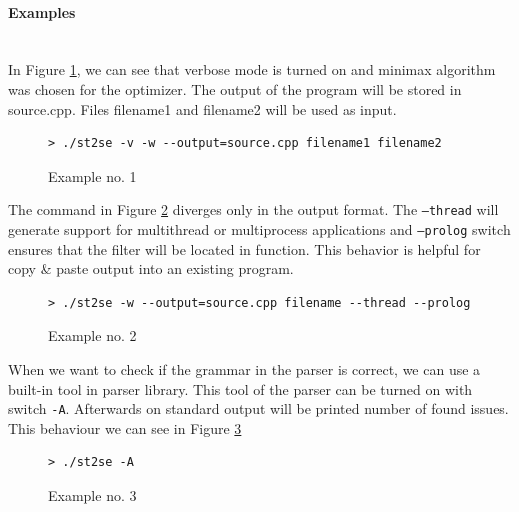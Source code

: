 \paragraph{Examples} \hspace{0pt} \\

In Figure \ref{exec/run1}, we can see that verbose mode is turned on and minimax
algorithm was chosen for the optimizer. The output of the program will be stored
in source.cpp. Files filename1 and filename2 will be used as input.

\begin{figure}[h]
	\lstset{style=npl}
\begin{lstlisting}
> ./st2se -v -w --output=source.cpp filename1 filename2
\end{lstlisting}
	\caption{Example no. 1}
	\label{exec/run1}
\end{figure}

The command in Figure \ref{exec/run2} diverges only in the output format. The
\texttt{--thread} will generate support for multithread or multiprocess applications and
\texttt{--prolog} switch ensures that the filter will be located in function. This
behavior is helpful for copy \& paste output into an existing program.

\begin{figure}[h]
	\lstset{style=npl}
\begin{lstlisting}
> ./st2se -w --output=source.cpp filename --thread --prolog
\end{lstlisting}
	\caption{Example no. 2}
	\label{exec/run2}
\end{figure}

When we want to check if the grammar in the parser is correct, we can use a
built-in tool in parser library. This tool of the parser can be turned on with
switch \texttt{-A}. Afterwards on standard output will be printed number of
found issues. This behaviour we can see in Figure \ref{exec/run3}

\begin{figure}[h]
	\lstset{style=npl}
\begin{lstlisting}
> ./st2se -A
\end{lstlisting}
	\caption{Example no. 3}
	\label{exec/run3}
\end{figure}


